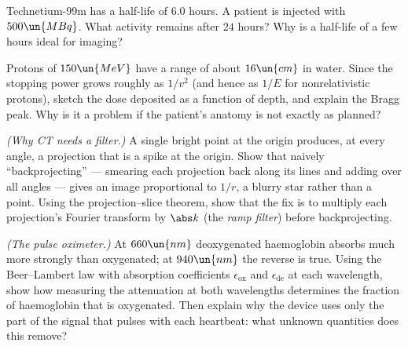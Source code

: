 \begin{problems}
 Technetium-99m has a half-life of $6.0$ hours. A patient is injected with $500\un{MBq}$. What activity remains after $24$ hours? Why is a half-life of a few hours ideal for imaging?

 Protons of $150\un{MeV}$ have a range of about $16\un{cm}$ in water. Since the stopping power grows roughly as $1/v^2$ (and hence as $1/E$ for nonrelativistic protons), sketch the dose deposited as a function of depth, and explain the Bragg peak. Why is it a problem if the patient's anatomy is not exactly as planned?

\core \label{prob:backprojection} \emph{(Why CT needs a filter.)} A single bright point at the origin produces, at every angle, a projection that is a spike at the origin. Show that naively ``backprojecting'' --- smearing each projection back along its lines and adding over all angles --- gives an image proportional to $1/r$, a blurry star rather than a point. Using the projection--slice theorem, show that the fix is to multiply each projection's Fourier transform by $\abs k$ (the \emph{ramp filter}) before backprojecting.

 \label{prob:oximeter} \emph{(The pulse oximeter.)} At $660\un{nm}$ deoxygenated haemoglobin absorbs much more strongly than oxygenated; at $940\un{nm}$ the reverse is true. Using the Beer--Lambert law with absorption coefficients $\epsilon_{\text{ox}}$ and $\epsilon_{\text{de}}$ at each wavelength, show how measuring the attenuation at both wavelengths determines the fraction of haemoglobin that is oxygenated. Then explain why the device uses only the part of the signal that pulses with each heartbeat: what unknown quantities does this remove?
\end{problems}

\begin{reading}
\end{reading}
